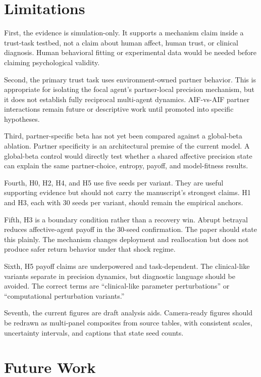 \section{Limitations}

First, the evidence is simulation-only. It supports a mechanism claim inside a trust-task testbed, not a claim about human affect, human trust, or clinical diagnosis. Human behavioral fitting or experimental data would be needed before claiming psychological validity.

Second, the primary trust task uses environment-owned partner behavior. This is appropriate for isolating the focal agent's partner-local precision mechanism, but it does not establish fully reciprocal multi-agent dynamics. AIF-vs-AIF partner interactions remain future or descriptive work until promoted into specific hypotheses.

Third, partner-specific beta has not yet been compared against a global-beta ablation. Partner specificity is an architectural premise of the current model. A global-beta control would directly test whether a shared affective precision state can explain the same partner-choice, entropy, payoff, and model-fitness results.

Fourth, H0, H2, H4, and H5 use five seeds per variant. They are useful supporting evidence but should not carry the manuscript's strongest claims. H1 and H3, each with 30 seeds per variant, should remain the empirical anchors.

Fifth, H3 is a boundary condition rather than a recovery win. Abrupt betrayal reduces affective-agent payoff in the 30-seed confirmation. The paper should state this plainly. The mechanism changes deployment and reallocation but does not produce safer return behavior under that shock regime.

Sixth, H5 payoff claims are underpowered and task-dependent. The clinical-like variants separate in precision dynamics, but diagnostic language should be avoided. The correct terms are ``clinical-like parameter perturbations'' or ``computational perturbation variants.''

Seventh, the current figures are draft analysis aids. Camera-ready figures should be redrawn as multi-panel composites from source tables, with consistent scales, uncertainty intervals, and captions that state seed counts.

\section{Future Work}

